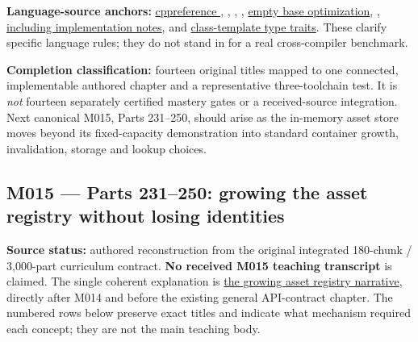 \textbf{Language-source anchors:} \href{https://en.cppreference.com/w/cpp/language/if}{cppreference }, \href{https://en.cppreference.com/w/cpp/language/constexpr}{}, \href{https://en.cppreference.com/w/cpp/language/consteval}{}, \href{https://en.cppreference.com/w/cpp/language/constinit}{}, \href{https://en.cppreference.com/w/cpp/language/ebo}{empty base optimization}, \href{https://en.cppreference.com/w/cpp/language/attributes/no_unique_address}{, including implementation notes}, and \href{https://en.cppreference.com/w/cpp/types}{class-template type traits}. These clarify specific language rules; they do not stand in for a real cross-compiler benchmark.

\textbf{Completion classification:} fourteen original titles mapped to one connected, implementable authored chapter and a representative three-toolchain test. It is \emph{not} fourteen separately certified mastery gates or a received-source integration. Next canonical M015, Parts 231--250, should arise as the in-memory asset store moves beyond its fixed-capacity demonstration into standard container growth, invalidation, storage and lookup choices.

\subsection{M015 --- Parts 231--250: growing the asset registry without losing identities}\label{appendix-fd090d982a15-m015-parts-231250-growing-the-asset-registry-without-losing-identities}

\hypertarget{appendix-fd090d982a15-m015-parts-231250-growing-the-asset-registry-without-losing-identities}{}

\textbf{Source status:} authored reconstruction from the original integrated 180-chunk / 3,000-part curriculum contract. \textbf{No received M015 teaching transcript} is claimed. The single coherent explanation is \hyperref[01-foundations-i-ch006-an-asset-registry-grows-while-its-handles-must-not-change]{the growing asset registry narrative}, directly after M014 and before the existing general API-contract chapter. The numbered rows below preserve exact titles and indicate what mechanism required each concept; they are not the main teaching body.

